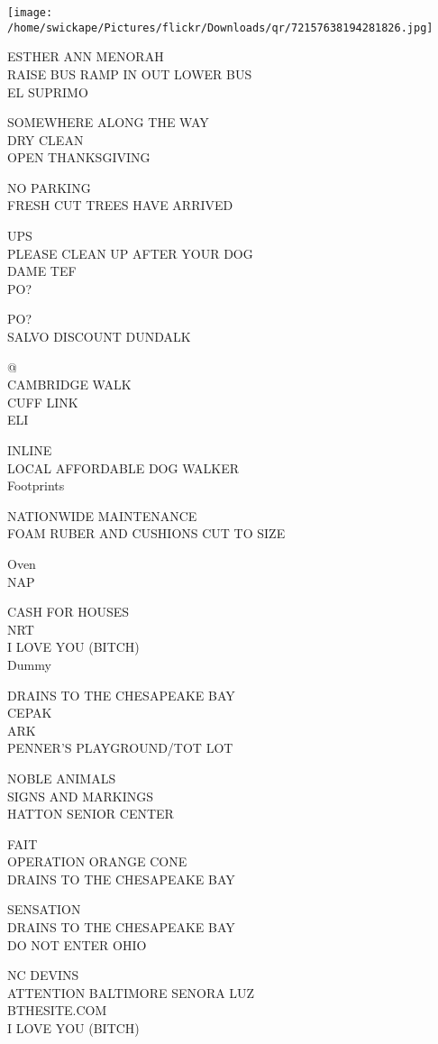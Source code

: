 \documentclass[10pt,letterpaper]{article}
\begin{document}
\texttt{[image: /home/swickape/Pictures/flickr/Downloads/qr/72157638194281826.jpg]}


ESTHER ANN MENORAH\\
RAISE BUS RAMP IN OUT LOWER BUS\\
EL SUPRIMO

SOMEWHERE ALONG THE WAY\\
DRY CLEAN\\
OPEN THANKSGIVING

NO PARKING\\
FRESH CUT TREES HAVE ARRIVED

UPS\\
PLEASE CLEAN UP AFTER YOUR DOG\\
DAME TEF\\
PO?

PO?\\
SALVO DISCOUNT DUNDALK

@\\
CAMBRIDGE WALK\\
CUFF LINK\\
ELI

INLINE\\
LOCAL AFFORDABLE DOG WALKER\\
Footprints

NATIONWIDE MAINTENANCE\\
FOAM RUBER AND CUSHIONS CUT TO SIZE

Oven\\
NAP

CASH FOR HOUSES\\
NRT\\
I LOVE YOU (BITCH)\\
Dummy

DRAINS TO THE CHESAPEAKE BAY\\
CEPAK\\
ARK\\
PENNER'S PLAYGROUND/TOT LOT

NOBLE ANIMALS\\
SIGNS AND MARKINGS\\
HATTON SENIOR CENTER

FAIT\\
OPERATION ORANGE CONE\\
DRAINS TO THE CHESAPEAKE BAY

SENSATION\\
DRAINS TO THE CHESAPEAKE BAY\\
DO NOT ENTER OHIO

NC DEVINS\\
ATTENTION BALTIMORE SENORA LUZ\\
BTHESITE.COM\\
I LOVE YOU (BITCH)
\end{document}

